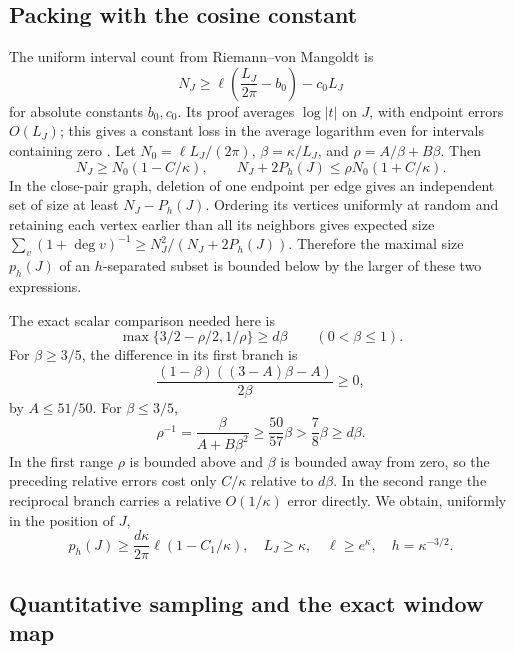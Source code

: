 \subsection{Packing with the cosine constant}

The uniform interval count from Riemann--von Mangoldt is
\[
 N_J\ge\ell\left(\frac{L_J}{2\pi}-b_0\right)-c_0 L_J
\]
for absolute constants \(b_0,c_0\). Its proof averages \(\log|t|\)
on \(J\), with endpoint errors \(O(L_J)\); this gives a constant
loss in the average logarithm even for intervals containing zero
\cite[Lemma~2.2, pp.~7--8]{mori-sharp2026}.
Let \(N_0=\ell L_J/(2\pi)\), \(\beta=\kappa/L_J\), and
\(\rho=A/\beta+B\beta\). Then
\[
 N_J\ge N_0(1-C/\kappa),\qquad
 N_J+2P_h(J)\le\rho N_0(1+C/\kappa).
\]
In the close-pair graph, deletion of one endpoint per edge gives
an independent set of size at least \(N_J-P_h(J)\). Ordering its
vertices uniformly at random and retaining each vertex earlier than
all its neighbors gives expected size
\(\sum_v(1+\deg v)^{-1}\ge N_J^2/(N_J+2P_h(J))\).
Therefore the maximal size \(p_h(J)\) of an \(h\)-separated
subset is bounded below by the larger of these two expressions.

The exact scalar comparison needed here is
\begin{equation}\label{eq:cosine-scalar}
 \max\{3/2-\rho/2,1/\rho\}\ge d\beta
                     \qquad(0<\beta\le1).
\end{equation}
For \(\beta\ge3/5\), the difference in its first branch is
\[
 \frac{(1-\beta)((3-A)\beta-A)}{2\beta}\ge0,
\]
by \(A\le51/50\). For \(\beta\le3/5\),
\[
 \rho^{-1}=\frac\beta{A+B\beta^2}
       \ge\frac{50}{57}\beta>\frac78\beta\ge d\beta.
\]
In the first range \(\rho\) is bounded above and \(\beta\)
is bounded away from zero, so the preceding relative errors cost
only \(C/\kappa\) relative to \(d\beta\). In the second range
the reciprocal branch carries a relative \(O(1/\kappa)\) error
directly. We obtain, uniformly in the position of \(J\),
\begin{equation}\label{eq:cosine-separated}
 p_h(J)\ge\frac{d\kappa}{2\pi}\ell(1-C_1/\kappa),
 \quad L_J\ge\kappa,\quad\ell\ge e^\kappa,
 \quad h=\kappa^{-3/2}.
\end{equation}

\subsection{Quantitative sampling and the exact window map}

